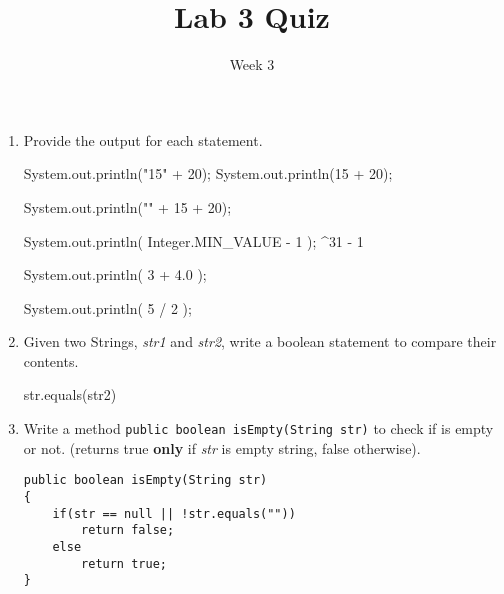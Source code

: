 \documentclass[addpoints]{exam}
\title{Lab 3 Quiz}
\date{Week 3}
\begin{document}
 

\Instructions
\begin{enumerate}
\newline
\item {}
Provide the output for each statement.

\begin{oneparchoices} 
\hspace{0.2cm}
\vspace{2em}

 \choice System.out.println("15" + 20);   
 \newline  
  \newline
 \choice System.out.println(15 + 20);   \vspace{1em}
 \newline  
 \newline  \vspace{1em}
 
 \choice System.out.println("" + 15 + 20);   \vspace{1em}
 \newline   \vspace{1em}
 \newline

 \choice System.out.println( Integer.MIN\_VALUE - 1 );   \vspace{1em}
 \newline 
 ^{31} - 1 \newline  \vspace{1em}

 \choice System.out.println( 3 + 4.0 );   \vspace{1em}
 \newline {}
 \newline  \vspace{1em}

 \choice System.out.println( 5 / 2 ); 
    \newline  \vspace{1em}
    \newline

 \end{oneparchoices}
 

 
 
 \item {}
Given two Strings, \textit{str1} and \textit{str2}, write a boolean statement to compare their contents.

 \vspace{2em}
    \Ans str.equals(str2)
 \vspace{2em}

 \item {}
Write a method \texttt{public boolean isEmpty(String str)} to check if  is empty or not. (returns true \textbf{only} if \textit{str} is empty string, false otherwise).
\newline
\Ans
\begin{lstlisting}
public boolean isEmpty(String str)
{ 
    if(str == null || !str.equals(""))
        return false;
    else
        return true;
}
\end{lstlisting}


\end{enumerate}
\end{document}
